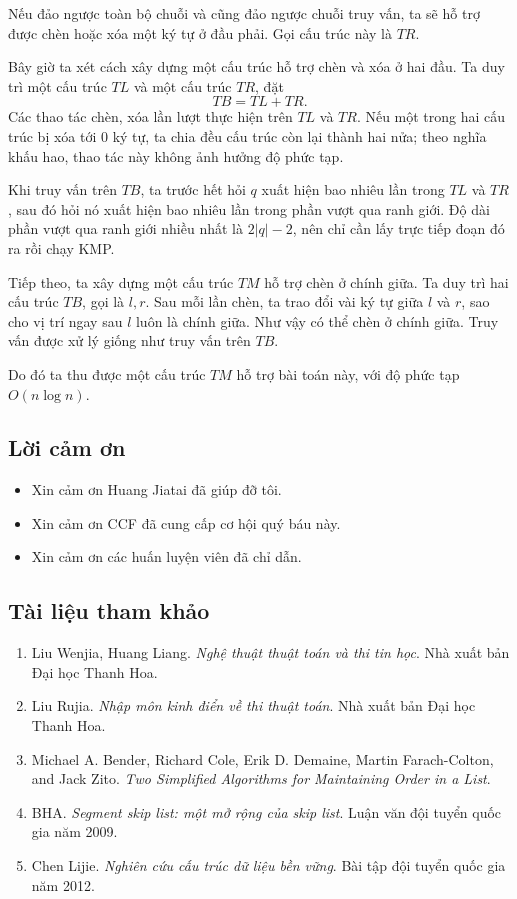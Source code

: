 \documentclass[11pt]{article}
\begin{document}
Nếu đảo ngược toàn bộ chuỗi và cũng đảo ngược chuỗi truy vấn, ta sẽ hỗ trợ
được chèn hoặc xóa một ký tự ở đầu phải. Gọi cấu trúc này là \(TR\).

Bây giờ ta xét cách xây dựng một cấu trúc hỗ trợ chèn và xóa ở hai đầu. Ta
duy trì một cấu trúc \(TL\) và một cấu trúc \(TR\), đặt
\[
  TB = TL + TR.
\]
Các thao tác chèn, xóa lần lượt thực hiện trên \(TL\) và \(TR\). Nếu một
trong hai cấu trúc bị xóa tới \(0\) ký tự, ta chia đều cấu trúc còn lại
thành hai nửa; theo nghĩa khấu hao, thao tác này không ảnh hưởng độ phức tạp.

Khi truy vấn trên \(TB\), ta trước hết hỏi \(q\) xuất hiện bao nhiêu lần
trong \(TL\) và \(TR\), sau đó hỏi nó xuất hiện bao nhiêu lần trong phần
vượt qua ranh giới. Độ dài phần vượt qua ranh giới nhiều nhất là
\(2|q|-2\), nên chỉ cần lấy trực tiếp đoạn đó ra rồi chạy KMP.

Tiếp theo, ta xây dựng một cấu trúc \(TM\) hỗ trợ chèn ở chính giữa. Ta duy
trì hai cấu trúc \(TB\), gọi là \(l,r\). Sau mỗi lần chèn, ta trao đổi vài
ký tự giữa \(l\) và \(r\), sao cho vị trí ngay sau \(l\) luôn là chính giữa.
Như vậy có thể chèn ở chính giữa. Truy vấn được xử lý giống như truy vấn
trên \(TB\).

Do đó ta thu được một cấu trúc \(TM\) hỗ trợ bài toán này, với độ phức tạp
\(O(n\log n)\).

\subsection{Lời cảm ơn}

\begin{itemize}
  \item Xin cảm ơn Huang Jiatai đã giúp đỡ tôi.
  \item Xin cảm ơn CCF đã cung cấp cơ hội quý báu này.
  \item Xin cảm ơn các huấn luyện viên đã chỉ dẫn.
\end{itemize}

\subsection{Tài liệu tham khảo}

\begin{enumerate}
  \item Liu Wenjia, Huang Liang. \emph{Nghệ thuật thuật toán và thi tin học}.
  Nhà xuất bản Đại học Thanh Hoa.
  \item Liu Rujia. \emph{Nhập môn kinh điển về thi thuật toán}. Nhà xuất bản
  Đại học Thanh Hoa.
  \item Michael A. Bender, Richard Cole, Erik D. Demaine, Martin
  Farach-Colton, and Jack Zito. \emph{Two Simplified Algorithms for
  Maintaining Order in a List}.
  \item BHA. \emph{Segment skip list: một mở rộng của skip list}. Luận văn
  đội tuyển quốc gia năm 2009.
  \item Chen Lijie. \emph{Nghiên cứu cấu trúc dữ liệu bền vững}. Bài tập đội
  tuyển quốc gia năm 2012.
\end{enumerate}
\end{document}
